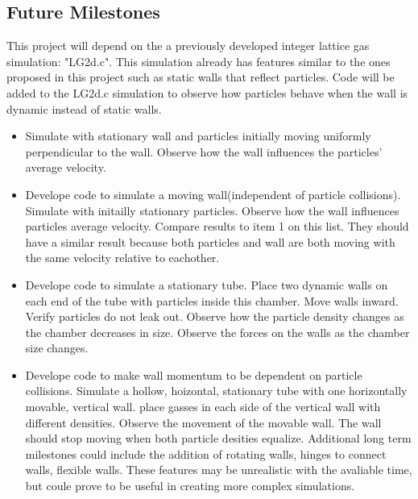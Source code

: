 \documentclass{article}
\begin{document}
\begin{itemize}
\section{Future Milestones}
This project will depend on the a previously developed integer lattice gas simulation: "LG2d.c". This simulation already has features similar to the ones proposed in this project such as static walls that reflect particles. Code will be added to the LG2d.c simulation to observe how particles behave when the wall is dynamic instead of static walls. 
\begin{itemize}
  \item Simulate with stationary wall and particles initially moving uniformly perpendicular to the wall. Observe how the wall influences the particles' average velocity.  
  \item Develope code to simulate a moving wall(independent of particle collisions). Simulate with initailly stationary particles. Observe how the wall influences particles average velocity. Compare results to item 1 on this list. They should have a similar result because both particles and wall are both moving with the same velocity relative to eachother.
  \item Develope code to simulate a stationary tube. Place two dynamic walls on each end of the tube with particles inside this chamber. Move walls inward. Verify particles do not leak out. Observe how the particle density changes as the chamber decreases in size. Observe the forces on the walls as the chamber size changes.
  \item Develope code to make wall momentum to be dependent on particle collisions. Simulate a hollow, hoizontal, stationary tube with one horizontally movable, vertical wall. place gasses in each side of the vertical wall with different densities. Observe the movement of the movable wall. The wall should stop moving when both particle desities equalize.\newline
\vspace{5mm}\newline
Additional long term milestones could include the addition of rotating walls, hinges to connect walls, flexible walls. These features may be unrealistic with the avaliable time, but coule prove to be useful in creating more complex simulations.
\end{itemize}

\end{itemize}
\end{document}
